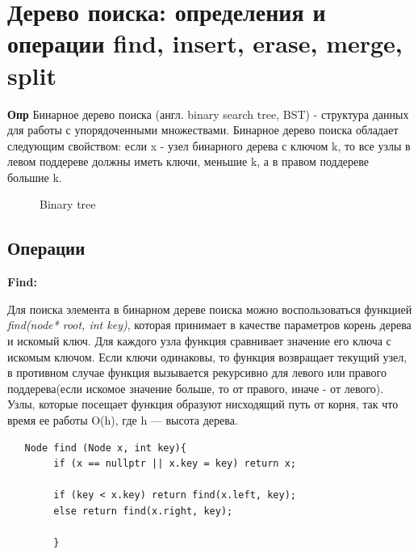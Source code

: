 \setcounter{section}{39}
\section{Дерево поиска: определения и операции find, insert, erase, merge, split}

\textbf{Опр} Бинарное дерево поиска (англ. binary search tree, BST) - структура данных для работы с упорядоченными множествами.
Бинарное дерево поиска обладает следующим свойством: если x - узел бинарного дерева с ключом k, то все узлы в левом поддереве должны иметь ключи, меньшие k, а в правом поддереве большие k.

\begin{figure}[h]
\caption {Binary tree}
\label{ris:image}
\end{figure}

\subsection*{Операции }
\textbf{Find: }

Для поиска элемента в бинарном дереве поиска можно воспользоваться функцией \textit{find(node* root, int key)}, которая принимает в качестве параметров корень дерева и искомый ключ. Для каждого узла функция сравнивает значение его ключа с искомым ключом. Если ключи одинаковы, то функция возвращает текущий узел, в противном случае функция вызывается рекурсивно для левого или правого поддерева(если искомое значение больше, то от правого, иначе - от левого). Узлы, которые посещает функция образуют нисходящий путь от корня, так что время ее работы O(h), где h — высота дерева.

\begin{lstlisting}
   Node find (Node x, int key){
        if (x == nullptr || x.key = key) return x;

        if (key < x.key) return find(x.left, key);
        else return find(x.right, key);
            
        }
\end{lstlisting}

